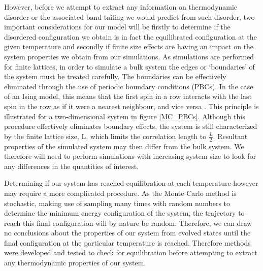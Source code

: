 \documentclass[11pt, twoside]{report}
\begin{document}
However, before we attempt to extract any information on thermodynamic disorder or the associated band tailing we would predict from such disorder, two important considerations for our model will be firstly to determine if the disordered configuration we obtain is in fact the equilibrated configuration at the given temperature and secondly if finite size effects are having an impact on the system properties we obtain from our simulations.
As simulations are performed for finite lattices, in order to simulate a bulk system the edges or `boundaries' of the system must be treated carefully. The boundaries can be effectively eliminated through the use of periodic boundary conditions (PBCs). In the case of an Ising model, this means that the first spin in a row interacts with the last spin in the row as if it were a nearest neighbour, and vice versa \cite{MC_Landau}. This principle is illustrated for a two-dimensional system in figure \ref{MC_PBCs}. Although this procedure effectively eliminates boundary effects, the system is still characterized by the finite lattice size, L, which limits the correlation length to $\frac{L}{2}$. Resultant properties of the simulated system may then differ from the bulk system. We therefore will need to perform simulations with increasing system size to look for any differences in the quantities of interest.

Determining if our system has reached equilibration at each temperature however may require a more complicated procedure. As the Monte Carlo method is stochastic, making use of sampling many times with random numbers to determine the minimum energy configuration of the system, the trajectory to reach this final configuration will by nature be random. Therefore, we can draw no conclusions about the properties of our system from evolved states until the final configuration at the particular temperature is reached. Therefore methods were developed and tested to check for equilibration before attempting to extract any thermodynamic properties of our system.
\end{document}
